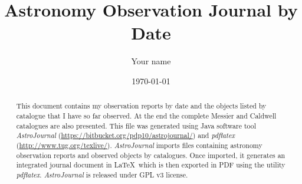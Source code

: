 \documentclass[10pt,twoside,a4paper,english]{article}
\title{Astronomy Observation Journal by Date}
\author{Your name}
\date{\today}
\begin{document}
\maketitle
\thispagestyle{empty}

\begin{abstract}
This document contains my observation reports by date and the objects listed by catalogue that I have so far observed. At the end the complete Messier and Caldwell catalogues are also presented. This file was generated using Java software tool {\it AstroJournal} (\href{https://bitbucket.org/pdp10/astrojournal/}{https://bitbucket.org/pdp10/astrojournal/}) and {\it pdflatex} (\href{http://www.tug.org/texlive/}{http://www.tug.org/texlive/}). {\it AstroJournal} imports files containing astronomy observation reports and observed objects by catalogues. Once imported, it generates an integrated journal document in \LaTeX\ which is then exported in PDF using the utility {\it pdflatex}. {\it AstroJournal} is released under GPL v3 license.
\end{abstract}

\tableofcontents


\clearpage


\small

\clearpage


\normalsize
\end{document}
